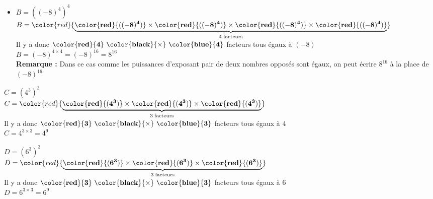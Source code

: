 \begin{corrige}
\begin{itemize}
                \bigskip    
                \item $B=\left((-8)^4\right)^{4}$\\
                $B=\color{red}{\underbrace{\mathbf{\color{red}{((-8)^4)}} \times \mathbf{\color{red}{((-8)^4)}}\times \mathbf{\color{red}{((-8)^4)}}\times \mathbf{\color{red}{((-8)^4)}}}_{4\thickspace\text{facteurs}}}$\\            
                Il y a donc $\mathbf{\color{red}{4}~\color{black}{\times}~\color{blue}{4}}$ facteurs tous égaux à $(-8)$\\
                $B=(-8)^{4\times4} = (-8)^{16}=  8^{16}$\\
                \textbf{Remarque : } Dans ce cas comme les puissances d'exposant pair de deux nombres opposés sont égaux, on peut écrire $ 8^{16}$ à la place de $(-8)^{16}$
            \end{itemize}
            \Coupe
            \begin{itemize}
                \def\item{} %
                \item $C=\left(4^3\right)^{3}$\\
                $C=\color{red}{\underbrace{\mathbf{\color{red}{(4^3)}} \times \mathbf{\color{red}{(4^3)}}\times \mathbf{\color{red}{(4^3)}}}_{3\thickspace\text{facteurs}}}$\\            
                Il y a donc $\mathbf{\color{red}{3}~\color{black}{\times}~\color{blue}{3}}$ facteurs tous égaux à $4$\\
                $C=4^{3\times3} = 4^{9}$

                \bigskip        
                \item $D=\left(6^3\right)^{3}$\\
                $D=\color{red}{\underbrace{\mathbf{\color{red}{(6^3)}} \times \mathbf{\color{red}{(6^3)}}\times \mathbf{\color{red}{(6^3)}}}_{3\thickspace\text{facteurs}}}$\\            
                Il y a donc $\mathbf{\color{red}{3}~\color{black}{\times}~\color{blue}{3}}$ facteurs tous égaux à $6$\\
                $D=6^{3\times3} = 6^{9}$        
            \end{itemize}

\end{corrige}
